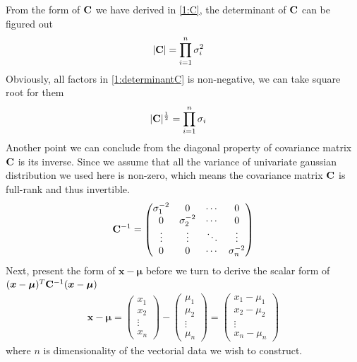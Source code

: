 \documentclass[11pt,a4paper]{article}
\newcommand{\htab}{\hspace*{0.63cm}}
\newcommand{\bmu}{\boldsymbol{\mu}}
\newcommand{\bx}{\boldsymbol{x}}
\newcommand{\half}{\frac{1}{2}}
\begin{document}
\htab From the form of $\mathbf{C}$ we have derived in \eqref{1:C}, the determinant of $\mathbf{C}$ can be figured out 
\begin{align}
    |\mathbf{C}| &= \prod_{i=1}^{n} \sigma_{i}^{2} \label{1:determinantC}
    \end{align}
\htab Obviously, all factors in \eqref{1:determinantC} is non-negative, we can take square root for them  
\begin{align}
    |\C|^{\half} &= \prod_{i=1}^{n} \sigmai \label{1:determinanChalf}
    \end{align}
\htab Another point we can conclude from the diagonal property of covariance matrix $\mathbf{C}$ is its inverse.
Since we assume that all the variance of univariate gaussian distribution we used here is non-zero, which 
means the covariance matrix $\mathbf{C}$ is full-rank and thus invertible.
\begin{align}
    \mathbf{C}^{-1} = \begin{pmatrix}
        \sigma_{1}^{-2} & 0 & \cdots & 0 \\
        0 & \sigma_{2}^{-2} & \cdots & 0 \\
        \vdots & \vdots & \ddots & \vdots \\
        0 & 0 & \cdots & \sigma_{n}^{-2}
    \end{pmatrix} \label{1:Cinv} 
    \end{align}
\htab Next, present the form of $ \bx - \bmu$ before we turn to 
derive the scalar form of $ (\bx - \bmu)^{T} \C^{-1} (\bx - \bmu)$
\begin{align}
    \bx - \bmu 
    = \begin{pmatrix}
        x_{1}  \\ x_{2} \\ \vdots \\ x_{n} 
        \end{pmatrix}
    - \begin{pmatrix}
        \mu_{1} \\ \mu_{2} \\ \vdots \\ \mu_{n}
        \end{pmatrix}
    = \begin{pmatrix}
        x_{1} -\mu_{1} \\ x_{2} -\mu_{2} \\ \vdots \\ x_{n} -\mu_{n}
        \end{pmatrix}
        \label{1:x-mu}
    \end{align}
\htab where $n$ is dimensionality of the vectorial data we wish to construct. \\
\end{document}
